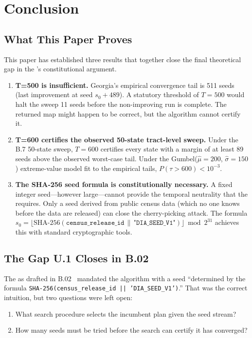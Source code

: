 \section{Conclusion}
\label{sec:conclusion}

\subsection{What This Paper Proves}

This paper has established three results that together close the final
theoretical gap in the \dia{}'s constitutional argument.

\begin{enumerate}
\item \textbf{T=500 is insufficient.}
      Georgia's empirical convergence tail is 511 seeds (last improvement at
      seed $s_0 + 489$).
      A statutory threshold of $T = 500$ would halt the sweep 11 seeds before
      the non-improving run is complete.
      The returned map might happen to be correct, but the algorithm cannot
      certify it.

\item \textbf{T=600 certifies the observed 50-state tract-level sweep.}
      Under the B.7 50-state sweep, $T = 600$ certifies every state with a
      margin of at least 89 seeds above the observed worst-case tail.
      Under the Gumbel($\hat\mu = 200$, $\hat\sigma = 150$) extreme-value model
      fit to the empirical tails, $P(\tau > 600) < 10^{-3}$.

\item \textbf{The SHA-256 seed formula is constitutionally necessary.}
      A fixed integer seed---however large---cannot provide the temporal
      neutrality that the \dia{} requires.
      Only a seed derived from public census data (which no one knows before
      the data are released) can close the cherry-picking attack.
      The formula $s_0 = \lfloor \mathrm{SHA\text{-}256}(\mathtt{census\_release\_id}
      \,\|\, \texttt{"DIA\_SEED\_V1"}) \rfloor \bmod 2^{31}$
      achieves this with standard cryptographic tools.
\end{enumerate}

\subsection{The Gap U.1 Closes in B.02}

The \dia{} as drafted in B.02~\citep{b02paper} mandated the \ar{} algorithm
with a seed ``determined by the formula
\texttt{SHA-256(census\_release\_id || 'DIA\_SEED\_V1')}.''
That was the correct intuition, but two questions were left open:
\begin{enumerate}
\item What search procedure selects the incumbent plan given the seed stream?
\item How many seeds must be tried before the search can certify it has
      converged?
\end{enumerate}

